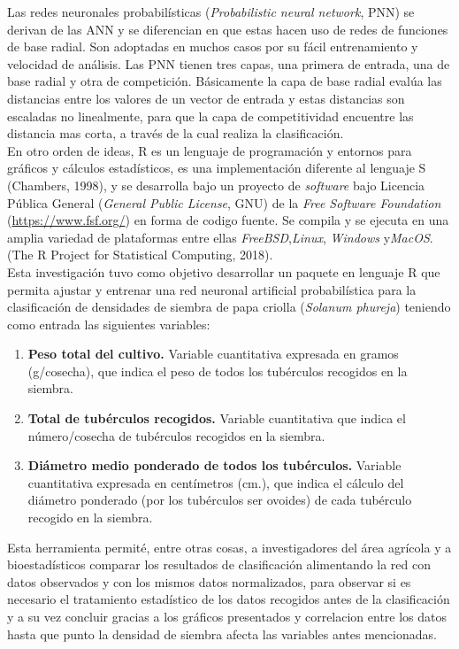 Las redes neuronales probabilísticas  (\textit{Probabilistic neural network}, PNN) se derivan de las ANN y se diferencian en que estas hacen uso de redes de funciones de base radial. Son adoptadas en muchos casos por su fácil entrenamiento y velocidad de análisis. Las PNN tienen tres capas, una primera de entrada, una de base radial y otra de competición. Básicamente la capa de base radial evalúa las distancias entre los valores de un vector de entrada y estas distancias son escaladas no linealmente, para que la capa de competitividad encuentre las distancia mas corta, a través de la cual realiza la clasificación.\\

En otro orden de ideas, R es un lenguaje de programación y entornos para gráficos y c\'alculos estad\'isticos, es una implementación diferente al lenguaje S (Chambers, 1998), y se desarrolla bajo un proyecto de \textit{software} bajo Licencia Pública General (\textit{General Public License}, GNU) de la \textit{Free Software Foundation} (\url{https://www.fsf.org/}) en forma de codigo fuente. Se compila y se ejecuta en una amplia variedad de plataformas entre ellas \textit{FreeBSD},\textit{Linux}, \textit{Windows} y\textit{MacOS}. (The R Project for Statistical Computing, 2018).\\

Esta investigación tuvo como objetivo desarrollar un paquete en lenguaje R que permita ajustar y entrenar una red neuronal artificial probabil\'istica para la clasificación de densidades de siembra de papa criolla (\textit{Solanum phureja}) teniendo como entrada las siguientes variables: 

\begin{enumerate}
    \item{\textbf{Peso total del cultivo.} Variable cuantitativa expresada en gramos (g/cosecha), que indica el peso de todos los tubérculos recogidos en la siembra.}
	\item{\textbf{Total de tubérculos recogidos.} Variable cuantitativa que indica el número/cosecha de tubérculos recogidos en la siembra.}
	\item{\textbf{Diámetro medio ponderado de todos los tubérculos.} Variable cuantitativa expresada en centímetros (cm.), que indica el c\'alculo del diámetro ponderado (por los tubérculos ser ovoides) de cada tubérculo recogido en la siembra.}
\end{enumerate}

Esta herramienta permité, entre otras cosas, a investigadores del área agrícola y a bioestadísticos comparar los resultados de clasificación alimentando la red con datos observados y con los mismos datos normalizados, para observar si es necesario el tratamiento estadístico de los datos recogidos antes de la clasificación y a su vez concluir gracias a los gráficos presentados y correlacion entre los datos hasta que punto la densidad de siembra afecta las variables antes mencionadas.\\

